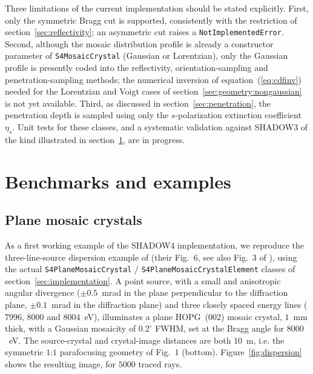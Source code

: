 \documentclass{iucr}
\begin{document}
Three limitations of the current implementation should be stated explicitly.
First, only the symmetric Bragg cut is supported, consistently with the
restriction of section~\ref{sec:reflectivity}; an asymmetric cut raises a
\texttt{NotImplementedError}. Second, although the mosaic distribution profile is
already a constructor parameter of \texttt{S4MosaicCrystal} (Gaussian or
Lorentzian), only the Gaussian profile is presently coded into the reflectivity,
orientation-sampling and penetration-sampling methods; the numerical inversion of
equation~(\ref{eq:cdfinv}) needed for the Lorentzian and Voigt cases of
section~\ref{sec:geometry:nongaussian} is not yet available. Third, as discussed in
section~\ref{sec:penetration}, the penetration depth is sampled using only the
$s$-polarization extinction coefficient $\eta_s$. Unit tests for these classes, and
a systematic validation against SHADOW3 of the kind illustrated in
section~\ref{sec:examples}, are in progress.


\section{Benchmarks and examples}
\label{sec:examples}

\subsection{Plane mosaic crystals}
\label{sec:benchmark1}

As a first working example of the SHADOW4 implementation, we reproduce the
three-line-source dispersion example of \cite{mosaicsSanchezDelRio1992} (their
Fig.~6, see also Fig.~3 of \cite{mosaicsSanchezDelRio2013}), using the actual
\texttt{S4PlaneMosaicCrystal} / \texttt{S4PlaneMosaicCrystalElement} classes of
section~\ref{sec:implementation}. A point source, with a small and anisotropic
angular divergence ($\pm 0.5$~mrad in the plane perpendicular to the diffraction
plane, $\pm 0.1$~mrad in the diffraction plane) and three closely spaced energy
lines ($7996$, $8000$ and $8004$~eV), illuminates a plane HOPG~(002) mosaic
crystal, $1$~mm thick, with a Gaussian mosaicity of $0.2^\circ$ FWHM, set at the
Bragg angle for $8000$~eV. The source-crystal and crystal-image distances are
both $10$~m, i.e. the symmetric $1$:$1$ parafocusing geometry of Fig.~1 (bottom).
Figure~\ref{fig:dispersion} shows the resulting image, for $5000$ traced rays.
\end{document}
